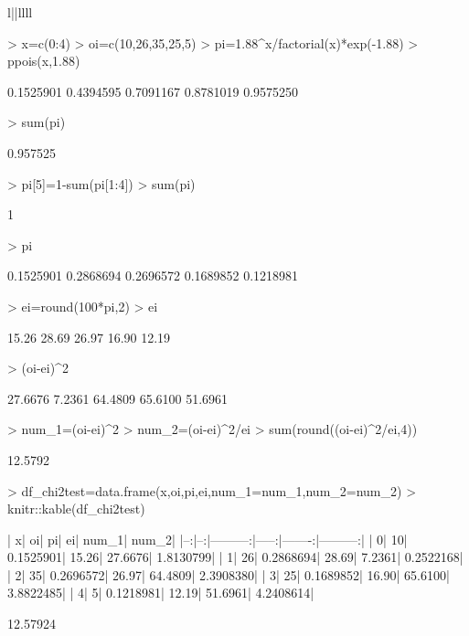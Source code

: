 \documentclass[10pt,spanish,es-nodecimaldot]{article}
\begin{document}
\begin{tabular}{l||llll}
\begin{Schunk}
\begin{Sinput}
> x=c(0:4)
> oi=c(10,26,35,25,5)
> pi=1.88^x/factorial(x)*exp(-1.88)
> ppois(x,1.88)
\end{Sinput}
\begin{Soutput}
[1] 0.1525901 0.4394595 0.7091167 0.8781019 0.9575250
\end{Soutput}
\begin{Sinput}
> sum(pi)
\end{Sinput}
\begin{Soutput}
[1] 0.957525
\end{Soutput}
\begin{Sinput}
> pi[5]=1-sum(pi[1:4])
> sum(pi)
\end{Sinput}
\begin{Soutput}
[1] 1
\end{Soutput}
\begin{Sinput}
> pi
\end{Sinput}
\begin{Soutput}
[1] 0.1525901 0.2868694 0.2696572 0.1689852 0.1218981
\end{Soutput}
\begin{Sinput}
> ei=round(100*pi,2)
> ei
\end{Sinput}
\begin{Soutput}
[1] 15.26 28.69 26.97 16.90 12.19
\end{Soutput}
\begin{Sinput}
> (oi-ei)^2
\end{Sinput}
\begin{Soutput}
[1] 27.6676  7.2361 64.4809 65.6100 51.6961
\end{Soutput}
\begin{Sinput}
> num_1=(oi-ei)^2
> num_2=(oi-ei)^2/ei
> sum(round((oi-ei)^2/ei,4))
\end{Sinput}
\begin{Soutput}
[1] 12.5792
\end{Soutput}
\end{Schunk}

\begin{Schunk}
\begin{Sinput}
> df_chi2test=data.frame(x,oi,pi,ei,num_1=num_1,num_2=num_2)
> knitr::kable(df_chi2test)
\end{Sinput}
\begin{Soutput}
|  x| oi|        pi|    ei|   num_1|     num_2|
|--:|--:|---------:|-----:|-------:|---------:|
|  0| 10| 0.1525901| 15.26| 27.6676| 1.8130799|
|  1| 26| 0.2868694| 28.69|  7.2361| 0.2522168|
|  2| 35| 0.2696572| 26.97| 64.4809| 2.3908380|
|  3| 25| 0.1689852| 16.90| 65.6100| 3.8822485|
|  4|  5| 0.1218981| 12.19| 51.6961| 4.2408614|
\end{Soutput}
\begin{Soutput}
[1] 12.57924
\end{Soutput}
\end{Schunk}


\end{tabular}
\end{document}
